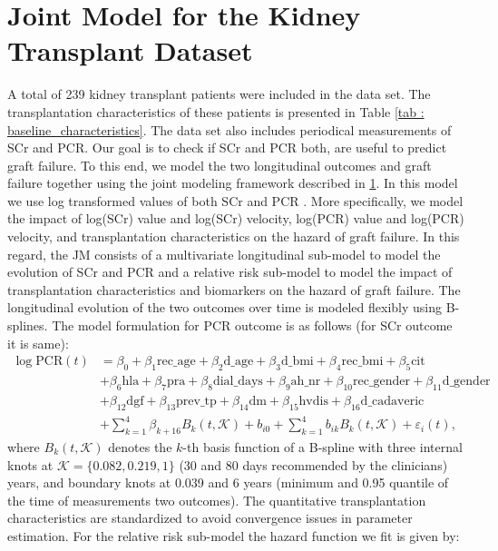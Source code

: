 
\section{Joint Model for the Kidney Transplant Dataset}
\label{sec : jm_amctx}
A total of 239 kidney transplant patients were included in the data set. The transplantation characteristics of these patients is presented in Table \ref{tab : baseline_characteristics}. The data set also includes periodical measurements of SCr and PCR. Our goal is to check if SCr and PCR both, are useful to predict graft failure. To this end, we model the two longitudinal outcomes and graft failure together using the joint modeling framework described in \ref{sec : jm_amctx}. In this model we use log transformed values of both SCr and PCR \citep{fournier2016joint}. More specifically, we model the impact of log(SCr) value and log(SCr) velocity, log(PCR) value and log(PCR) velocity, and transplantation characteristics on the hazard of graft failure. In this regard, the JM consists of a multivariate longitudinal sub-model to model the evolution of SCr and PCR and a relative risk sub-model to model the impact of transplantation characteristics and biomarkers on the hazard of graft failure. The longitudinal evolution of the two outcomes over time is modeled flexibly using B-splines. The model formulation for PCR outcome is as follows (for SCr outcome it is same):
\begin{equation}
\label{eq : long_model_prias}
\begin{aligned}
\log \mbox{PCR}(t) &= \beta_0 + \beta_1 \mbox{rec\_age} + \beta_2 \mbox{d\_age} + \beta_3 \mbox{d\_bmi} + \beta_4 \mbox{rec\_bmi} + \beta_5 \mbox{cit}\\
&+ \beta_6 \mbox{hla} + \beta_7 \mbox{pra}+ \beta_8 \mbox{dial\_days} + \beta_9 \mbox{ah\_nr} + \beta_{10} \mbox{rec\_gender} + \beta_{11} \mbox{d\_gender} \\
&+ \beta_{12} \mbox{dgf} + \beta_{13} \mbox{prev\_tp} + \beta_{14} \mbox{dm} + \beta_{15} \mbox{hvdis}+ \beta_{16} \mbox{d\_cadaveric}\\
&+\sum_{k=1}^4 \beta_{k+16} B_k(t,\mathcal{K}) +  b_{i0} + \sum_{k=1}^4 b_{ik} B_k(t,\mathcal{K}) + 
\varepsilon_i(t),
\end{aligned}
\end{equation}
where $B_k(t, \mathcal{K})$ denotes the $k$-th basis function of a B-spline with three internal knots at $\mathcal{K} =\{0.082, 0.219, 1\}$ (30 and 80 days recommended by the clinicians) years, and boundary knots at 0.039 and 6 years (minimum and 0.95 quantile of the time of measurements two outcomes). The quantitative transplantation characteristics are standardized to avoid convergence issues in parameter estimation. For the relative risk sub-model the hazard function we fit is given by:
